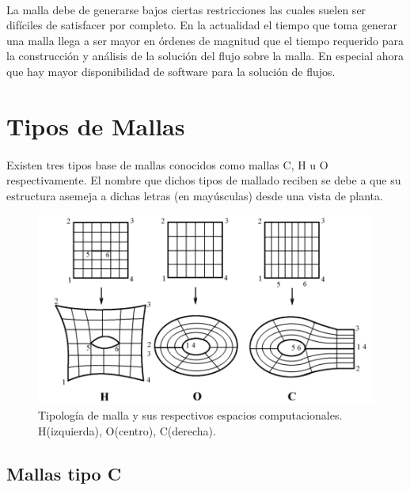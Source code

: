 \documentclass[letterpaper, openright, 12pt]{book}
\begin{document}
	
	\paragraph*{}
		La malla debe de generarse bajos ciertas restricciones las cuales suelen ser difíciles de satisfacer por completo. En la actualidad el tiempo que toma generar una malla llega a ser mayor en órdenes de magnitud que el tiempo requerido para la construcción y análisis de la solución del flujo sobre la malla. En especial ahora que hay mayor disponibilidad de software para la solución de flujos.\cite{thompsonhandbook}
	
	
	\section{Tipos de Mallas}
		\paragraph*{}
		Existen tres tipos base de mallas conocidos como mallas C, H u O respectivamente. El nombre que dichos tipos de mallado reciben se debe a que su estructura asemeja a dichas letras (en mayúsculas) desde una vista de planta.
		
		\begin{figure}[htbp!]
			\centering
			\includegraphics[width=170mm]{./Imagenes/tipos-de-malla}
			\captionsetup{justification=centering, margin=2cm}
			\caption[Tipología de mallas]{Tipología de malla y sus respectivos espacios computacionales. H(izquierda), O(centro), C(derecha).\cite{vladimir-grid}}
			\label{fig:tipos-de-malla}
		\end{figure}
		
		\subsection{Mallas tipo C}
\end{document}
